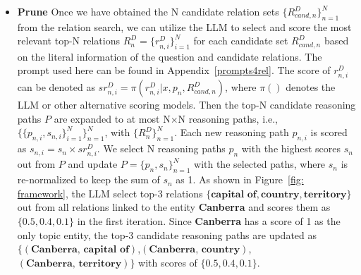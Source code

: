 \begin{itemize}[leftmargin=*]
    \item \textbf{Prune} Once we have obtained the N candidate relation sets $\{R^{D}_{cand,n}\}^{N}_{n=1}$ from the relation search, we can utilize the LLM to select and score the most relevant top-N relations $R^{D}_{n}=\{r^{D}_{n,i}\}^{N}_{i=1}$ for each candidate set $R^{D}_{cand,n}$ based on the literal information of the question and candidate relations. The prompt used here can be found in Appendix~\ref{prompts4rel}. The score of  $r^{D}_{n,i}$ can be denoted as $sr^{D}_{n,i}=\pi(r^{D}_{n,i}|x,p_{n},R^{D}_{cand,n})$, where $\pi()$ denotes the LLM or other alternative scoring models.
    Then the top-N candidate reasoning paths $P$ are expanded to at most N$\times$N reasoning paths, i.e., $\{\{p_{n,i},s_{n,i}\}^{N}_{i=1}\}^{N}_{n=1}$, with $\{R^{D}_{n}\}_{n=1}^{N}$. Each new reasoning path $p_{n,i}$ is scored as $s_{n,i}=s_{n}\times sr^{D}_{n,i}$. We select N reasoning paths $p_n$ with the highest scores $s_n$ out from $P$ and update $P=\{p_n,s_n\}^{N}_{n=1}$ with the selected paths, where $s_n$ is re-normalized to keep the sum of $s_n$ as 1.
    As shown in Figure~\ref{fig: framework}, the LLM select top-3 relations $\{\textbf{capital of}, \textbf{country}, \textbf{territory}\}$ out from all relations linked to the entity \textbf{Canberra} and scores them as $\{0.5, 0.4, 0.1\}$ in the first iteration. Since \textbf{Canberra} has a score of 1 as the only topic entity, the top-3 candidate reasoning paths are updated as $\{(\textbf{Canberra, capital of})$,$(\textbf{Canberra, country})$,$(\textbf{Canberra, territory})\}$ with scores of $\{0.5, 0.4, 0.1\}$.

        
\end{itemize}

